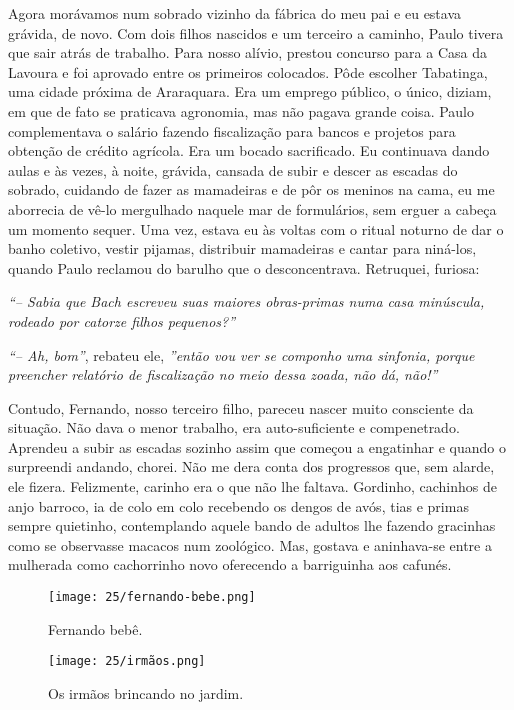 Agora morávamos num sobrado vizinho da fábrica do meu pai e eu estava grávida, de novo.
Com dois filhos nascidos e um terceiro a caminho, Paulo tivera que sair atrás de trabalho.
Para nosso alívio, prestou concurso para a Casa da Lavoura e foi aprovado entre os primeiros colocados.
Pôde escolher Tabatinga, uma cidade próxima de Araraquara.
Era um emprego público, o único, diziam, em que de fato se praticava agronomia, mas não pagava grande coisa.
Paulo complementava o salário fazendo fiscalização para bancos e projetos para obtenção de crédito agrícola.
Era um bocado sacrificado.
Eu continuava dando aulas e às vezes, à noite, grávida, cansada de subir e descer as escadas do sobrado, cuidando de fazer as mamadeiras e de pôr os meninos na cama, eu me aborrecia de vê-lo mergulhado naquele mar de formulários, sem erguer a cabeça um momento sequer.
Uma vez, estava eu às voltas com o ritual noturno de dar o banho coletivo, vestir pijamas, distribuir mamadeiras e cantar para niná-los, quando Paulo reclamou do barulho que o desconcentrava.
Retruquei, furiosa: 

\textit{``-- Sabia que Bach escreveu suas maiores obras-primas numa casa minúscula, rodeado por catorze filhos pequenos?''}

\textit{``-- Ah, bom''}, rebateu ele, \textit{''então vou ver se componho uma sinfonia, porque preencher relatório de fiscalização no meio dessa zoada, não dá, não!''}

Contudo, Fernando, nosso terceiro filho, pareceu nascer muito consciente da situação.
Não dava o menor trabalho, era auto-suficiente e compenetrado.
Aprendeu a subir as escadas sozinho assim que começou a engatinhar e quando o surpreendi andando, chorei.
Não me dera conta dos progressos que, sem alarde, ele fizera.
Felizmente, carinho era o que não lhe faltava.
Gordinho, cachinhos de anjo barroco, ia de colo em colo recebendo os dengos de avós, tias e primas sempre quietinho, contemplando aquele bando de adultos lhe fazendo gracinhas como se observasse macacos num zoológico.
Mas, gostava e aninhava-se entre a mulherada como cachorrinho novo oferecendo a barriguinha aos cafunés.

\begin{figure}
\centering
\texttt{[image: 25/fernando-bebe.png]}
\caption{Fernando bebê.}
\end{figure}

\begin{figure}
\centering
\texttt{[image: 25/irmãos.png]}
\caption{Os irmãos brincando no jardim.}
\end{figure}
